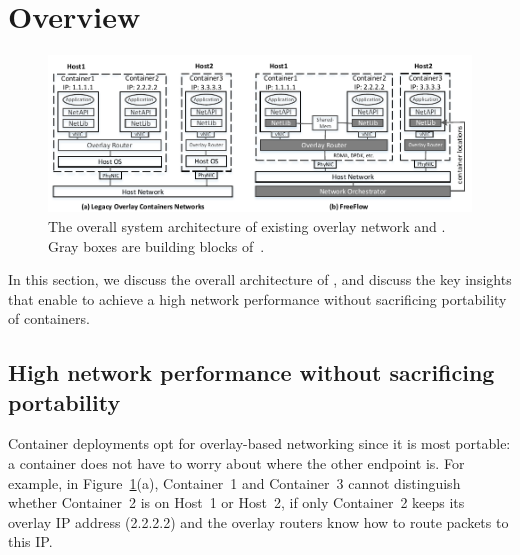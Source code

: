 \section{Overview} \label{sec:overview}

\begin{figure}[t!] 
     \centering 
     \includegraphics[width=7in]{figures/system-arch.pdf} 
    \caption{\label{fig:sysarch} The overall system architecture of existing overlay network and \sysname. Gray boxes are building blocks of~\sysname.}
\end{figure} 

In this section, we discuss the overall architecture of \sysname, and discuss the
key insights that enable \sysname to achieve a high network performance without
sacrificing portability of containers.

\subsection{High network performance without sacrificing portability}

Container deployments opt for overlay-based networking since it is most
portable: a container does not have to worry about where the other endpoint is.
For example, in Figure~\ref{fig:sysarch}(a), Container~1 and Container~3 cannot
distinguish whether Container~2 is on Host~1 or Host~2, if only Container~2
keeps its overlay IP address (2.2.2.2) and the overlay routers know how to
route packets to this IP. 

